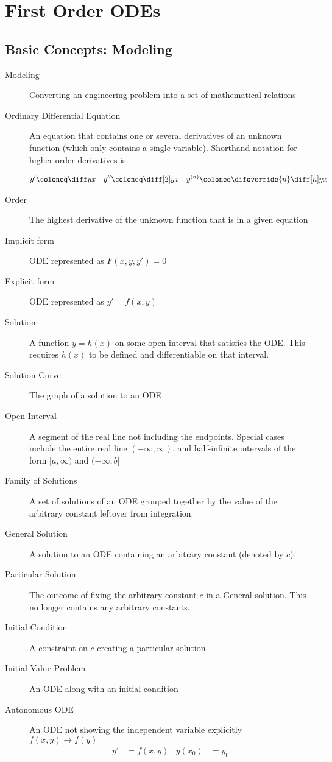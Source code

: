\chapter{First Order ODEs}
\section{Basic Concepts: Modeling}

\begin{description}
    \item[Modeling] Converting an engineering problem into a set of mathematical relations
    \item[Ordinary Differential Equation] An equation that contains one or several derivatives of an unknown function (which only contains a single variable). Shorthand notation for higher order derivatives is:

        \begin{align}
            y'      & \coloneq \diff yx                    &
            y''     & \coloneq \diff[2] yx                 &
            y^{(n)} & \coloneq \difoverride{n} \diff[n] yx
        \end{align}

    \item[Order] The highest derivative of the unknown function that is in a given equation
    \item[Implicit form] ODE represented as $F(x, y, y') = 0$
    \item[Explicit form] ODE represented as $y' = f(x, y)$
    \item[Solution] A function $y = h(x)$ on some open interval that satisfies the ODE. This requires $h(x)$ to be defined and differentiable on that interval.
    \item[Solution Curve] The graph of a solution to an ODE
    \item[Open Interval] A segment of the real line not including the endpoints. Special cases include the entire real line $(-\infty,\infty)$, and half-infinite intervals of the form $[a, \infty)$ and $(-\infty, b]$
    \item[Family of Solutions] A set of solutions of an ODE grouped together by the value of the arbitrary constant leftover from integration.
    \item[General Solution] A solution to an ODE containing an arbitrary constant (denoted by $c$)
    \item[Particular Solution] The outcome of fixing the arbitrary constant $c$ in a General solution. This no longer contains any arbitrary constants.
    \item[Initial Condition] A constraint on $c$ creating a particular solution.
    \item[Initial Value Problem] An ODE along with an initial condition
    \item[Autonomous ODE] An ODE not showing the independent variable explicitly $f(x, y) \to f(y)$
        \begin{align}
            y'       & = f(x, y) &
            y(x_{0}) & = y_{0}
        \end{align}
\end{description}



